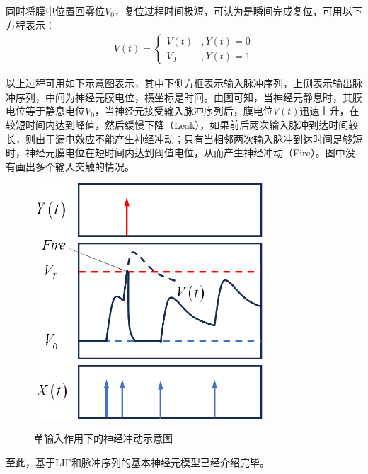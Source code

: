 \documentclass[11pt]{article}
\begin{document}
同时将膜电位置回零位$V_0$，复位过程时间极短，可认为是瞬间完成复位，可用以下方程表示：
\begin{align}
  V(t)=\left\{\begin{aligned}
                V(t) & ,Y(t)=0  \\
                V_0  & ,Y(t)= 1
              \end{aligned}\right.
  \label{eq:LIF复位过程}
\end{align}\par
以上过程可用如下示意图表示，其中下侧方框表示输入脉冲序列，上侧表示输出脉冲序列，中间为神经元膜电位，横坐标是时间。由图可知，当神经元静息时，其膜电位等于静息电位$V_0$，当神经元接受输入脉冲序列后，膜电位$V(t)$迅速上升，在较短时间内达到峰值，然后缓慢下降（Leak），如果前后两次输入脉冲到达时间较长，则由于漏电效应不能产生神经冲动；只有当相邻两次输入脉冲到达时间足够短时，神经元膜电位在短时间内达到阈值电位，从而产生神经冲动（Fire）。图中没有画出多个输入突触的情况。
\begin{figure}[H]
  \centering
  \includegraphics[width=0.8\textwidth]{神经冲动示意图.png}
  \label{fig:神经冲动示意图}
  \caption{单输入作用下的神经冲动示意图}
\end{figure}
至此，基于LIF和脉冲序列的基本神经元模型已经介绍完毕。
\end{document}

